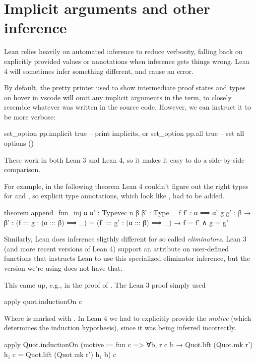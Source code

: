 \section{Implicit arguments and other inference}
Lean relies heavily on automated inference to reduce verbosity, falling back on explicitly provided
values or annotations when inference gets things wrong.
Lean 4 will sometimes infer something different, and cause an error.

By default, the pretty printer used to show intermediate proof states and types on hover in vscode will
omit any implicit arguments in the term, to closely resemble whatever was written in the source code.
However, we can instruct it to be more verbose:
\begin{leancode}
  set_option pp.implicit true -- print implicits, or
  set_option pp.all true      -- set all options ()
\end{leancode}
These work in both Lean 3 and Lean 4, so it makes it easy to do a side-by-side comparison.

For example, in the following theorem Lean 4 couldn't figure out the right types for  and 
, so explicit type annotations, which look like , had to be added.
\begin{leancode}
  theorem append_fun_inj {α α' : Typevec n} {β β' : Type _} 
                         {f f' : α ⟹ α'} {g g' : β → β'} :
  (f ::: g : (α ::: β) ⟹ _) = (f' ::: g' : (α ::: β) ⟹ _) → f = f' ∧ g = g'
\end{leancode}

Similarly, Lean does inference sligthly different for so called \emph{eliminators}.
Lean 3 (and more recent versions of Lean 4) support an  attribute on user-defined
functions that instructs Lean to use this specialized eliminator inference, but the version we're using
does not have that.

This came up, e.g., in the proof of . The Lean 3 proof simply used
\begin{leancode}    
  apply quot.inductionOn c
\end{leancode}  
Where  is marked with .
In Lean 4 we had to explicitly provide the \emph{motive} (which determines the induction hypothesis), 
since it was being inferred incorrectly.
\begin{leancode}
  apply Quot.inductionOn (motive := fun c => ∀b, r c b → 
                                      Quot.lift (Quot.mk r') h₁ c 
                                      = Quot.lift (Quot.mk r') h₁ b) 
            c
\end{leancode}

